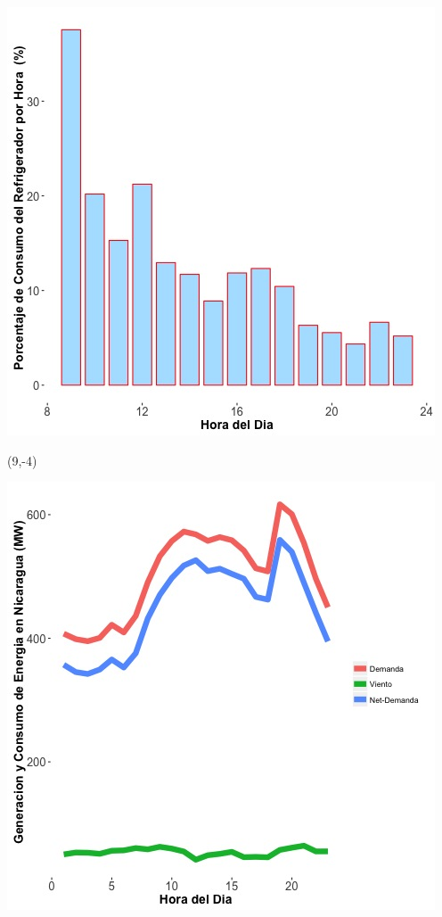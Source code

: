\documentclass{article}\usepackage[]{graphicx}\usepackage[]{color}
\newenvironment{knitrout}{}{} %
\begin{document}
\begin{knitrout}
\color{fgcolor}
\includegraphics[scale=0.65]{figure/A11_fridge_energy_pct.jpg} 
\end{knitrout}

 \begin{textblock}{1}(9,-4)
\begin{minipage}{20em}
\begingroup

\endgroup
\end{minipage}
\end{textblock}

\vspace{20cm}
 

\begin{knitrout}
\color{fgcolor}
\includegraphics[scale=0.65]{figure/gridplot1.jpg} 
\end{knitrout}
\end{document}
